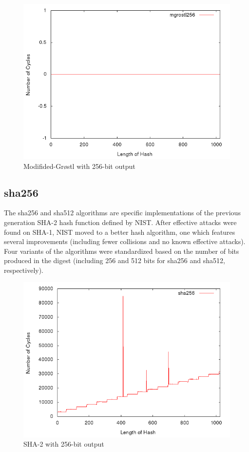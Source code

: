 \documentclass[10pt,a4paper]{article}
\begin{document}
    \begin{figure}[H]
        \begin{center}
            \includegraphics[scale=0.5]{images/mgrostl256.png} 
            \caption{Modifided-Gr{\o}stl with 256-bit output}
        \end{center}
    \end{figure}

\subsection{sha256}
The sha256 and sha512 algorithms are specific implementations of the previous generation SHA-2 hash function defined by NIST.  After effective attacks were found on SHA-1, NIST moved to a better hash algorithm, one which features several improvements (including fewer collisions and no known effective attacks).  Four variants of the algorithms were standardized based on the number of bits produced in the digest (including 256 and 512 bits for sha256 and sha512, respectively).

    \begin{figure}[H]
        \begin{center}
            \includegraphics[scale=0.5]{images/sha256.png} 
            \caption{SHA-2 with 256-bit output}
        \end{center}
    \end{figure}
\end{document}
